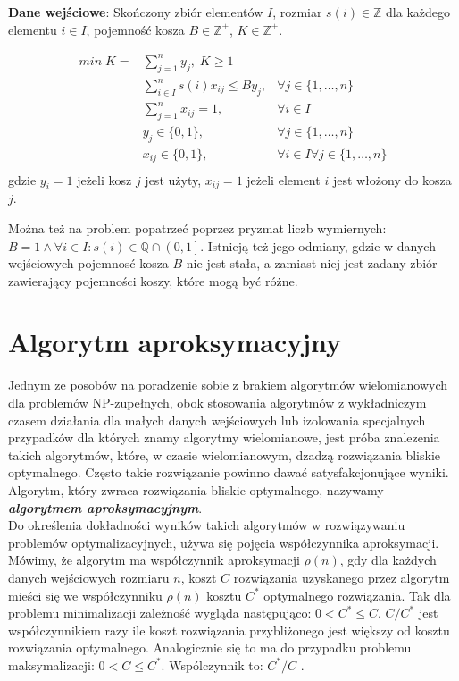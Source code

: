\textbf{Dane wejściowe}: Skończony zbiór elementów $I$, rozmiar $s(i) \in \mathbb{Z}$ dla każdego elementu $i \in I$, pojemność kosza $B \in \mathbb{Z^+}$, $K \in \mathbb{Z^+}$.

\begin{align*}
	min \; K = &\sum_{j=1}^{n} y_{j}, \; K \geq 1 \\
	&\sum_{i \in I}^{n} s(i)x_{ij} \leq By_j, &\forall j \in \{1, \dots, n\} \\
    &\sum_{j=1}^{n} x_{ij} = 1, \; &\forall i \in I \\
	&y_j \in \{0,1\}, \; & \forall j \in \{1, \dots, n\} \\
	&x_{ij} \in \{0,1\}, \; & \forall i \in I \forall j \in \{1, \dots, n\} \\
\end{align*}
gdzie $y_i = 1$ jeżeli kosz $j$ jest użyty,  $x_{ij} = 1$ jeżeli element $i$ jest włożony do kosza $j$.
	
Można też na problem popatrzeć poprzez pryzmat liczb wymiernych:
$B = 1 \land \forall i \in I: s(i) \in \mathbb{Q} \cap \left(0, 1\right]$. Istnieją też jego odmiany, gdzie w danych wejściowych pojemnosć kosza $B$ nie jest stała, a zamiast niej jest zadany zbiór zawierający pojemności koszy, które mogą być różne.

\section{Algorytm aproksymacyjny}
Jednym ze posobów na poradzenie sobie z brakiem algorytmów wielomianowych dla problemów NP-zupełnych, obok stosowania algorytmów z wykładniczym czasem działania dla małych danych wejściowych lub izolowania specjalnych przypadków dla których znamy algorytmy wielomianowe, jest próba znalezenia takich algorytmów, które, w czasie wielomianowym, dzadzą rozwiązania bliskie optymalnego. Często takie rozwiązanie powinno dawać satysfakcjonujące wyniki. Algorytm, który zwraca rozwiązania bliskie optymalnego, nazywamy \textbf{\textit{algorytmem aproksymacyjnym}}. \\
Do określenia dokładności wyników takich algorytmów w rozwiązywaniu problemów optymalizacyjnych, używa się pojęcia współczynnika aproksymacji. Mówimy, że algorytm ma współczynnik aproksymacji $\rho(n)$, gdy dla każdych danych wejściowych rozmiaru $n$, koszt $C$ rozwiązania uzyskanego przez algorytm mieści się we współczynniku $\rho(n)$ kosztu $C^*$ optymalnego rozwiązania. Tak dla problemu minimalizacji zależność wygląda następująco: $0< C^* \leq C$. $C/C^*$ jest współczynnikiem razy ile koszt rozwiązania przybliżonego jest większy od kosztu rozwiązania optymalnego. Analogicznie się to ma do przypadku problemu maksymalizacji: $0< C \leq C^*$. Wspólczynnik to: $C^*/C$  \cite[Rozdział~35]{Cormen_algos}. \\


